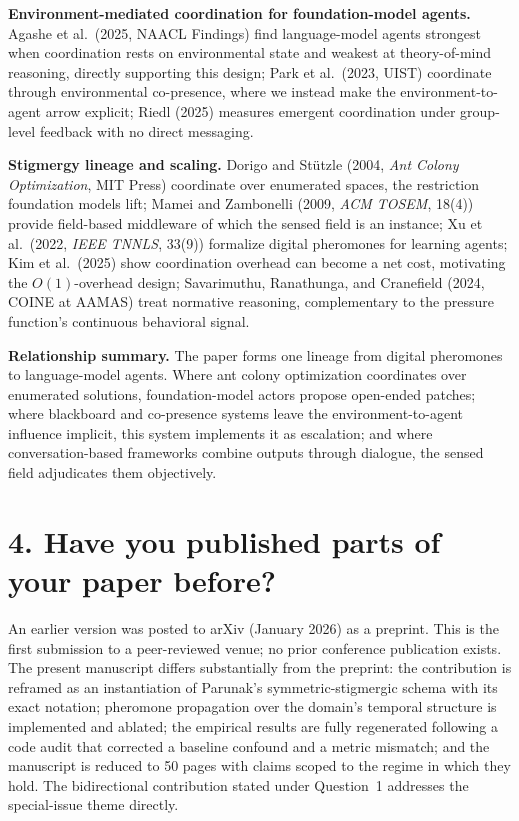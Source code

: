\documentclass[11pt]{article}
\begin{document}
\textbf{Environment-mediated coordination for foundation-model agents.} Agashe et al.\ (2025, NAACL Findings) find language-model agents strongest when coordination rests on environmental state and weakest at theory-of-mind reasoning, directly supporting this design; Park et al.\ (2023, UIST) coordinate through environmental co-presence, where we instead make the environment-to-agent arrow explicit; Riedl (2025) measures emergent coordination under group-level feedback with no direct messaging.

\textbf{Stigmergy lineage and scaling.} Dorigo and St\"utzle (2004, \emph{Ant Colony Optimization}, MIT Press) coordinate over enumerated spaces, the restriction foundation models lift; Mamei and Zambonelli (2009, \emph{ACM TOSEM}, 18(4)) provide field-based middleware of which the sensed field is an instance; Xu et al.\ (2022, \emph{IEEE TNNLS}, 33(9)) formalize digital pheromones for learning agents; Kim et al.\ (2025) show coordination overhead can become a net cost, motivating the $O(1)$-overhead design; Savarimuthu, Ranathunga, and Cranefield (2024, COINE at AAMAS) treat normative reasoning, complementary to the pressure function's continuous behavioral signal.

\textbf{Relationship summary.} The paper forms one lineage from digital pheromones to language-model agents. Where ant colony optimization coordinates over enumerated solutions, foundation-model actors propose open-ended patches; where blackboard and co-presence systems leave the environment-to-agent influence implicit, this system implements it as escalation; and where conversation-based frameworks combine outputs through dialogue, the sensed field adjudicates them objectively.

\section*{4. Have you published parts of your paper before?}

An earlier version was posted to arXiv (January 2026) as a preprint. This is the first submission to a peer-reviewed venue; no prior conference publication exists. The present manuscript differs substantially from the preprint: the contribution is reframed as an instantiation of Parunak's symmetric-stigmergic schema with its exact notation; pheromone propagation over the domain's temporal structure is implemented and ablated; the empirical results are fully regenerated following a code audit that corrected a baseline confound and a metric mismatch; and the manuscript is reduced to 50 pages with claims scoped to the regime in which they hold. The bidirectional contribution stated under Question~1 addresses the special-issue theme directly.
\end{document}
